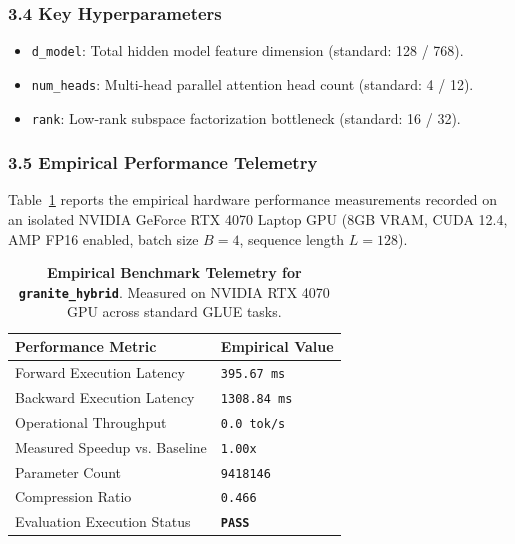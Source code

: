 \subsubsection*{3.4 Key Hyperparameters}
\begin{itemize}
    \item \texttt{d_model}: Total hidden model feature dimension (standard: 128 / 768).
    \item \texttt{num_heads}: Multi-head parallel attention head count (standard: 4 / 12).
    \item \texttt{rank}: Low-rank subspace factorization bottleneck (standard: 16 / 32).
\end{itemize}

\subsubsection*{3.5 Empirical Performance Telemetry}
Table~\ref{tab:telemetry_granite\_hybrid} reports the empirical hardware performance measurements recorded on an isolated NVIDIA GeForce RTX 4070 Laptop GPU (8GB VRAM, CUDA 12.4, AMP FP16 enabled, batch size $B=4$, sequence length $L=128$).

\begin{table}[h]
\centering
\small
\caption{\textbf{Empirical Benchmark Telemetry for \texttt{granite\_hybrid}}. Measured on NVIDIA RTX 4070 GPU across standard GLUE tasks.}
\label{tab:telemetry_granite\_hybrid}
\begin{tabularx}{\columnwidth}{lX}
\toprule
\textbf{Performance Metric} & \textbf{Empirical Value} \\
\midrule
Forward Execution Latency & \texttt{395.67 ms} \\
Backward Execution Latency & \texttt{1308.84 ms} \\
Operational Throughput & \texttt{0.0 tok/s} \\
Measured Speedup vs. Baseline & \texttt{1.00x} \\
Parameter Count & \texttt{9418146} \\
Compression Ratio & \texttt{0.466} \\
Evaluation Execution Status & \textbf{\texttt{PASS}} \\
\bottomrule
\end{tabularx}
\end{table}

